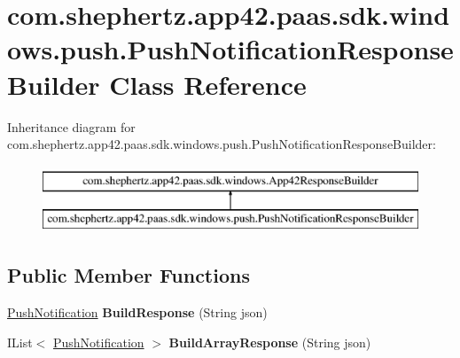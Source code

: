 \hypertarget{classcom_1_1shephertz_1_1app42_1_1paas_1_1sdk_1_1windows_1_1push_1_1_push_notification_response_builder}{\section{com.\+shephertz.\+app42.\+paas.\+sdk.\+windows.\+push.\+Push\+Notification\+Response\+Builder Class Reference}
\label{classcom_1_1shephertz_1_1app42_1_1paas_1_1sdk_1_1windows_1_1push_1_1_push_notification_response_builder}
}
Inheritance diagram for com.\+shephertz.\+app42.\+paas.\+sdk.\+windows.\+push.\+Push\+Notification\+Response\+Builder\+:\begin{figure}[H]
\begin{center}
\leavevmode
\includegraphics[height=2.000000cm]{classcom_1_1shephertz_1_1app42_1_1paas_1_1sdk_1_1windows_1_1push_1_1_push_notification_response_builder}
\end{center}
\end{figure}
\subsection*{Public Member Functions}
\begin{DoxyCompactItemize}
\item 
\hypertarget{classcom_1_1shephertz_1_1app42_1_1paas_1_1sdk_1_1windows_1_1push_1_1_push_notification_response_builder_abaf82886813ac2fef24e0996a28c0193}{\hyperlink{classcom_1_1shephertz_1_1app42_1_1paas_1_1sdk_1_1windows_1_1push_1_1_push_notification}{Push\+Notification} {\bfseries Build\+Response} (String json)}\label{classcom_1_1shephertz_1_1app42_1_1paas_1_1sdk_1_1windows_1_1push_1_1_push_notification_response_builder_abaf82886813ac2fef24e0996a28c0193}

\item 
\hypertarget{classcom_1_1shephertz_1_1app42_1_1paas_1_1sdk_1_1windows_1_1push_1_1_push_notification_response_builder_a7459a6b60ecb75d725a0db90b4eb97b5}{I\+List$<$ \hyperlink{classcom_1_1shephertz_1_1app42_1_1paas_1_1sdk_1_1windows_1_1push_1_1_push_notification}{Push\+Notification} $>$ {\bfseries Build\+Array\+Response} (String json)}\label{classcom_1_1shephertz_1_1app42_1_1paas_1_1sdk_1_1windows_1_1push_1_1_push_notification_response_builder_a7459a6b60ecb75d725a0db90b4eb97b5}

\end{DoxyCompactItemize}
